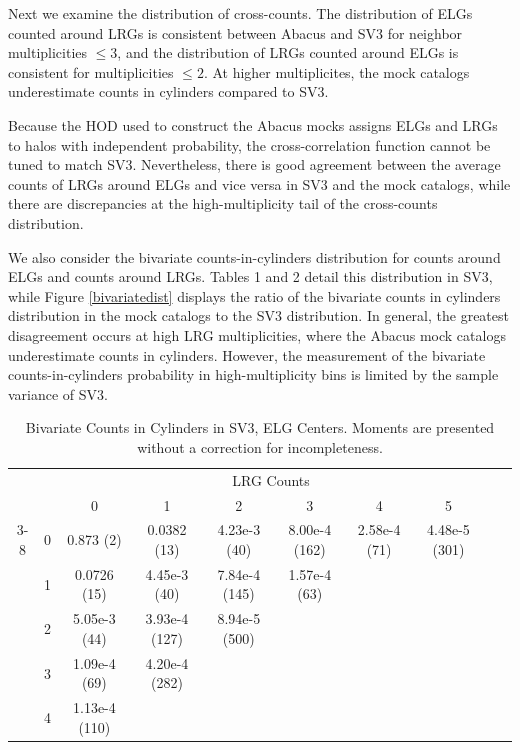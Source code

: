 \documentclass[fleqn,usenatbib]{mnras}
\begin{document}
Next we examine the distribution of cross-counts. The distribution of ELGs counted around LRGs is consistent between Abacus and SV3 for neighbor multiplicities $\leq 3$, and the distribution of LRGs counted around ELGs is consistent for multiplicities $\leq 2$. At higher multiplicites, the mock catalogs underestimate counts in cylinders compared to SV3.

Because the HOD used to construct the Abacus mocks assigns ELGs and LRGs to halos with independent probability, the cross-correlation function cannot be tuned to match SV3. Nevertheless, there is good agreement between the average counts of LRGs around ELGs and vice versa in SV3 and the mock catalogs, while there are discrepancies at the high-multiplicity tail of the cross-counts distribution.


We also consider the bivariate counts-in-cylinders distribution for counts around ELGs and counts around LRGs. Tables 1 and 2 detail this distribution in SV3, while Figure \ref{bivariatedist} displays the ratio of the bivariate counts in cylinders distribution in the mock catalogs to the SV3 distribution. In general, the greatest disagreement occurs at high LRG multiplicities, where the Abacus mock catalogs underestimate counts in cylinders. However, the measurement of the bivariate counts-in-cylinders probability in high-multiplicity bins is limited by the sample variance of SV3.


\begin{table}
    \caption{Bivariate Counts in Cylinders in SV3, ELG Centers. Moments are presented without a correction for incompleteness.}
    \begin{tabular}{c c c c c c c c c c}
    \multicolumn{2}{c}{}&\multicolumn{6}{c}{LRG Counts}\\
     \multicolumn{1}{c}{}& &  0&1&  2 &3 &4 &5\\ \cline{3-8}
    \multirow[|l|]{5}{*}{\rotatebox[origin=c]{90}{ELG Counts}}& \multicolumn{1}{c|}{0} & 
    0.873 (2) & 0.0382 (13) & 4.23e-3 (40) & 8.00e-4 (162) & 2.58e-4 (71) & 4.48e-5 (301) \\
     &\multicolumn{1}{c|}{1} & 0.0726 (15) & 4.45e-3 (40) & 7.84e-4 (145) & 1.57e-4 (63)\\
     &\multicolumn{1}{c|}{2} & 5.05e-3 (44) & 3.93e-4 (127) & 8.94e-5 (500) \\
    &\multicolumn{1}{c|}{3} & 1.09e-4 (69) & 4.20e-4 (282) \\
    &\multicolumn{1}{c|}{4} & 1.13e-4 (110) \\
    
    \end{tabular}
    
\end{table}
\end{document}
